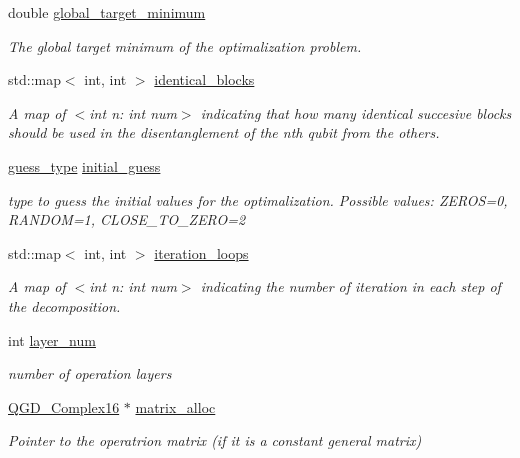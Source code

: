 \begin{DoxyCompactItemize}
double \hyperlink{class_decomposition___base_a6bc9e026221fab165ecc56f287d731a8}{global\+\_\+target\+\_\+minimum}
\begin{DoxyCompactList}\small\item\em The global target minimum of the optimalization problem. \end{DoxyCompactList}\item 
std\+::map$<$ int, int $>$ \hyperlink{class_n___qubit___decomposition_a92081a657b7bd6877831538a67f1d65e}{identical\+\_\+blocks}
\begin{DoxyCompactList}\small\item\em A map of $<$int n\+: int num$>$ indicating that how many identical succesive blocks should be used in the disentanglement of the nth qubit from the others. \end{DoxyCompactList}\item 
\hyperlink{decomposition_2include_2_decomposition___base_8h_a0e76cf2e4eb5edbf067ba5014ffa2134}{guess\+\_\+type} \hyperlink{class_decomposition___base_ad8df090247ebaea3ebb69e7737b194b9}{initial\+\_\+guess}
\begin{DoxyCompactList}\small\item\em type to guess the initial values for the optimalization. Possible values\+: Z\+E\+R\+OS=0, R\+A\+N\+D\+OM=1, C\+L\+O\+S\+E\+\_\+\+T\+O\+\_\+\+Z\+E\+RO=2 \end{DoxyCompactList}\item 
std\+::map$<$ int, int $>$ \hyperlink{class_decomposition___base_aa6f08845d47e18b6e6739b46d8fe35eb}{iteration\+\_\+loops}
\begin{DoxyCompactList}\small\item\em A map of $<$int n\+: int num$>$ indicating the number of iteration in each step of the decomposition. \end{DoxyCompactList}\item 
int \hyperlink{class_operation__block_a907101b9a80e6ebeaa96cc7b973cf413}{layer\+\_\+num}
\begin{DoxyCompactList}\small\item\em number of operation layers \end{DoxyCompactList}\item 
\hyperlink{struct_q_g_d___complex16}{Q\+G\+D\+\_\+\+Complex16} $\ast$ \hyperlink{class_operation_ade4d28d271ca13950d04363aac1c382e}{matrix\+\_\+alloc}
\begin{DoxyCompactList}\small\item\em Pointer to the operatrion matrix (if it is a constant general matrix) \end{DoxyCompactList}\item 

\end{DoxyCompactItemize}
